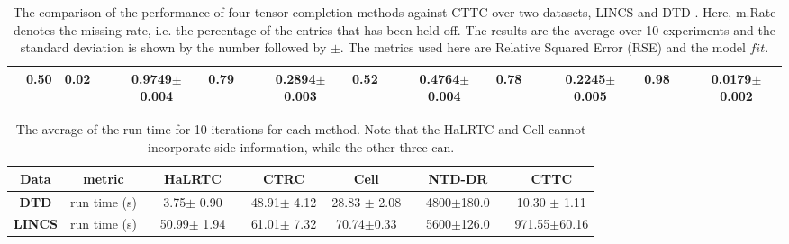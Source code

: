 \documentclass{article}
\begin{document}
\begin{table}
{\begin{tabular}{l ||c ||c c|| c c|| c c|| c c ||c c}
& 0.50
&0.02~~
&0.9749$\pm$0.004
& 0.79~~
& 0.2894$\pm$0.003
&0.52~~
&0.4764$\pm$0.004
&0.78~~
& 0.2245$\pm$ 0.005
&\textbf{0.98}~~
&\textbf{{0.0179$\pm$0.002}}
\\
\hline
\hline
\end{tabular}
}
\vspace{0.09in}
\caption{%
The comparison of the performance of four tensor completion methods against CTTC over two datasets, LINCS and DTD \cite{jamali2022ntd}. Here, m.Rate denotes the missing rate, i.e. the percentage of the entries that has been held-off. The results are the average over 10 experiments and the standard deviation is shown by the number followed by $\pm$. The metrics used here are Relative Squared Error  (RSE) and the model $fit$. }
\label{tab:res}
\end{table} 

\begin{table}
\renewcommand{\arraystretch}{1.4}
\renewcommand{\arraystretch}{1.4}
\centering
\resizebox{0.7\textwidth}{!}
{
\begin{tabular}{||c|| c ||c c c c c||}
\hline
Data
&metric
&{~~\textbf{HaLRTC}~~}
&{~~\textbf{CTRC}~~} 
& {~~\textbf{Cell}~~}  &{~~\textbf{{NTD-DR}}~~} 
&{~~\textbf{CTTC}~~ }
\\
\hline
\hline
{\textbf{DTD}}
&\cellcolor{black!05!white}
run time (s) 
& \cellcolor{black!05!white} 
3.75$\pm$ 0.90
&\cellcolor{black!05!white}
48.91$\pm$ 4.12
&\cellcolor{black!05!white}
28.83 $\pm$ 2.08
& \cellcolor{black!05!white}
4800$\pm$180.0
& \cellcolor{black!05!white}
10.30 $\pm$ 1.11
\\
\hline
\hline
{\textbf{LINCS}}
&\cellcolor{black!05!white}
run time (s)
& \cellcolor{black!05!white}
50.99$\pm$ 1.94
& \cellcolor{black!05!white}
61.01$\pm$ 7.32
&\cellcolor{black!05!white}
70.74$\pm$0.33
&\cellcolor{black!05!white}
5600$\pm$126.0
& \cellcolor{black!05!white}
{{971.55$\pm$60.16}}
\\
\hline
\hline
\end{tabular}}
\vspace{0.09in}
\caption{
The average of the run time for 10 iterations for each method. Note that the HaLRTC and Cell cannot incorporate side information, while the other three can.}
\label{tab:time}
\end{table} 
\end{document}
